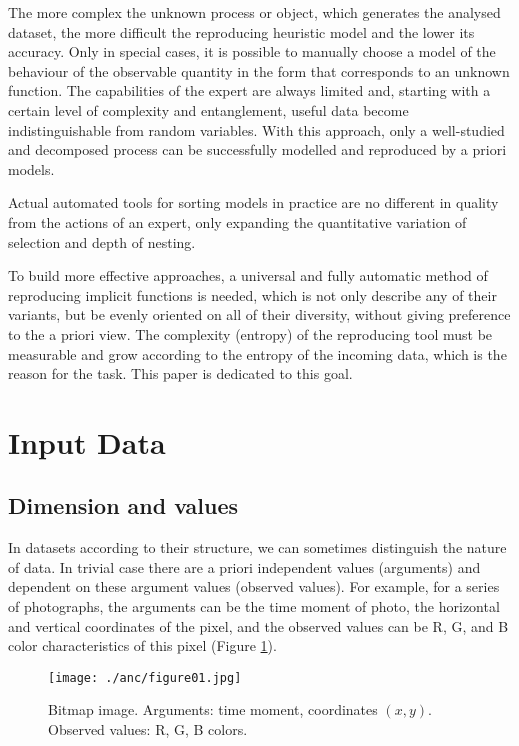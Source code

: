 \documentclass[a4paper, 11pt, oneside]{book}
\begin{document}
The more complex the unknown process or object, which generates the analysed dataset, the more difficult the reproducing heuristic model and the lower its accuracy. Only in special cases, it is possible to manually choose a model of the behaviour of the observable quantity in the form that corresponds to an unknown function. The capabilities of the expert are always limited and, starting with a certain level of complexity and entanglement, useful data become indistinguishable from random variables. With this approach, only a well-studied and decomposed process can be successfully modelled and reproduced by a priori models.

Actual automated tools for sorting models in practice are no different in quality from the actions of an expert, only expanding the quantitative variation of selection and depth of nesting.

To build more effective approaches, a universal and fully automatic method of reproducing implicit functions is needed, which is not only describe any of their variants, but be evenly oriented on all of their diversity, without giving preference to the a priori view. The complexity (entropy) of the reproducing tool must be measurable and grow according to the entropy of the incoming data, which is the reason for the task. This paper is dedicated to this goal.

\section{Input Data}
\subsection{Dimension and values}\label{subs:dimension_and_values}
In datasets according to their structure, we can sometimes distinguish the nature of data. In trivial case there are a priori independent values (arguments) and dependent on these argument values (observed values). For example, for a series of photographs, the arguments can be the time moment of photo, the horizontal and vertical coordinates of the pixel, and the observed values can be R, G, and B color characteristics of this pixel (Figure \ref{fig:pixels}).

\begin{figure}[h!]
  \centering
  \texttt{[image: ./anc/figure01.jpg]}
  \caption{Bitmap image. Arguments: time moment, coordinates $(x, y)$. Observed values: R, G, B colors.}
  \label{fig:pixels}
\end{figure}
\end{document}
